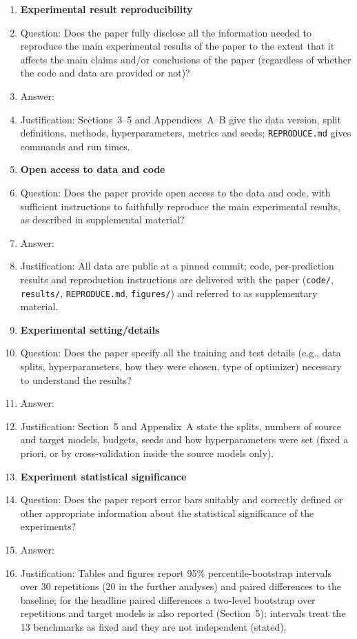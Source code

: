 \begin{enumerate}
    \item {\bf Experimental result reproducibility}
    \item[] Question: Does the paper fully disclose all the information needed to reproduce the main experimental results of the paper to the extent that it affects the main claims and/or conclusions of the paper (regardless of whether the code and data are provided or not)?
    \item[] Answer: \answerYes{} %
    \item[] Justification: Sections~3--5 and Appendices~A--B give the data version, split definitions, methods, hyperparameters, metrics and seeds; \texttt{REPRODUCE.md} gives commands and run times.


\item {\bf Open access to data and code}
    \item[] Question: Does the paper provide open access to the data and code, with sufficient instructions to faithfully reproduce the main experimental results, as described in supplemental material?
    \item[] Answer: \answerYes{} %
    \item[] Justification: All data are public at a pinned commit; code, per-prediction results and reproduction instructions are delivered with the paper (\texttt{code/}, \texttt{results/}, \texttt{REPRODUCE.md}, \texttt{figures/}) and referred to as supplementary material.


\item {\bf Experimental setting/details}
    \item[] Question: Does the paper specify all the training and test details (e.g., data splits, hyperparameters, how they were chosen, type of optimizer) necessary to understand the results?
    \item[] Answer: \answerYes{} %
    \item[] Justification: Section~5 and Appendix~A state the splits, numbers of source and target models, budgets, seeds and how hyperparameters were set (fixed a priori, or by cross-validation inside the source models only).

\item {\bf Experiment statistical significance}
    \item[] Question: Does the paper report error bars suitably and correctly defined or other appropriate information about the statistical significance of the experiments?
    \item[] Answer: \answerYes{} %
    \item[] Justification: Tables and figures report 95\% percentile-bootstrap intervals over 30 repetitions (20 in the further analyses) and paired differences to the baseline; for the headline paired differences a two-level bootstrap over repetitions and target models is also reported (Section~5); intervals treat the 13 benchmarks as fixed and they are not independent (stated).


\end{enumerate}
